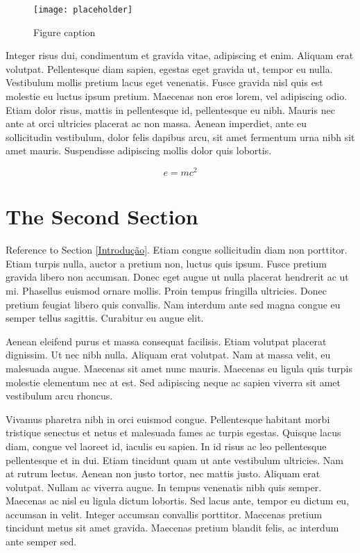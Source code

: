 \documentclass[preprint,12pt,times]{elsarticle}
\begin{document}
	\begin{figure}[h]
		\centering\texttt{[image: placeholder]}
		\caption{Figure caption}
	\end{figure}

	Integer risus dui, condimentum et gravida vitae, adipiscing et enim. Aliquam erat volutpat. Pellentesque diam sapien, egestas eget gravida ut, tempor eu nulla. Vestibulum mollis pretium lacus eget venenatis. Fusce gravida nisl quis est molestie eu luctus ipsum pretium. Maecenas non eros lorem, vel adipiscing odio. Etiam dolor risus, mattis in pellentesque id, pellentesque eu nibh. Mauris nec ante at orci ultricies placerat ac non massa. Aenean imperdiet, ante eu sollicitudin vestibulum, dolor felis dapibus arcu, sit amet fermentum urna nibh sit amet mauris. Suspendisse adipiscing mollis dolor quis lobortis.

	\begin{equation}
	\label{eq:emc}
	e = mc^2
	\end{equation}

	\section{The Second Section}
	\label{S:3}

	Reference to Section \ref{Introdução}. Etiam congue sollicitudin diam non porttitor. Etiam turpis nulla, auctor a pretium non, luctus quis ipsum. Fusce pretium gravida libero non accumsan. Donec eget augue ut nulla placerat hendrerit ac ut mi. Phasellus euismod ornare mollis. Proin tempus fringilla ultricies. Donec pretium feugiat libero quis convallis. Nam interdum ante sed magna congue eu semper tellus sagittis. Curabitur eu augue elit.

	Aenean eleifend purus et massa consequat facilisis. Etiam volutpat placerat dignissim. Ut nec nibh nulla. Aliquam erat volutpat. Nam at massa velit, eu malesuada augue. Maecenas sit amet nunc mauris. Maecenas eu ligula quis turpis molestie elementum nec at est. Sed adipiscing neque ac sapien viverra sit amet vestibulum arcu rhoncus.

	Vivamus pharetra nibh in orci euismod congue. Pellentesque habitant morbi tristique senectus et netus et malesuada fames ac turpis egestas. Quisque lacus diam, congue vel laoreet id, iaculis eu sapien. In id risus ac leo pellentesque pellentesque et in dui. Etiam tincidunt quam ut ante vestibulum ultricies. Nam at rutrum lectus. Aenean non justo tortor, nec mattis justo. Aliquam erat volutpat. Nullam ac viverra augue. In tempus venenatis nibh quis semper. Maecenas ac nisl eu ligula dictum lobortis. Sed lacus ante, tempor eu dictum eu, accumsan in velit. Integer accumsan convallis porttitor. Maecenas pretium tincidunt metus sit amet gravida. Maecenas pretium blandit felis, ac interdum ante semper sed.
\end{document}

